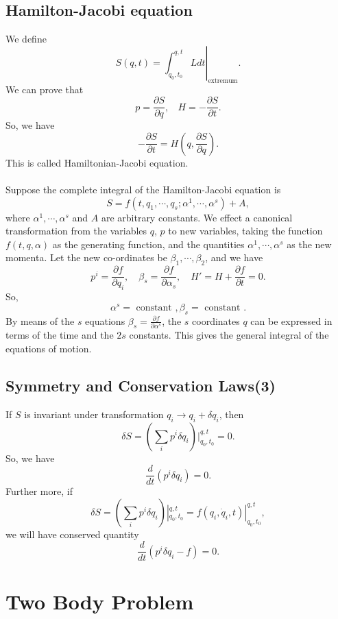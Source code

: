 \section{Hamilton-Jacobi equation}
We define
\[S(q,t)=\left. \int_{q_0,t_0}^{q,t} L dt\right|_{\mathrm{extremum}}.\]
We can prove that
\[p = \frac{\partial S}{\partial q}, \ \ \ \ H = -\frac{\partial S}{\partial t}.\]
So, we have
\[-\frac{\partial S}{\partial t} = H (q,\frac{\partial S}{\partial q}).\]
This is called Hamiltonian-Jacobi equation.\\ \\
Suppose the complete integral of the Hamilton-Jacobi equation is
\[S=f(t,q_1,\cdots,q_s;\alpha^1,\cdots,\alpha^s)+A,\]
where $\alpha^1,\cdots,\alpha^s$ and $A$ are arbitrary constants. 
We effect a canonical transformation from the variables $q$, $p$ to new variables, taking the function $f(t,q,\alpha)$ as the generating function, and the quantities $\alpha^1,\cdots,\alpha^s$ as the new momenta.
Let the new co-ordinates be $\beta_1,\cdots,\beta_2$, and we have
\[p^i = \frac{\partial f}{\partial q_i} ,\quad \beta_s = \frac{\partial f}{\partial \alpha_s} ,\quad H' = H + \frac{\partial f}{\partial t} =0.\]
So,
\[\alpha^s = \mbox{ constant }, \beta_s = \mbox{ constant }.\]
By means of the $s$ equations $\beta_s = \frac{\partial f}{\partial \alpha^s}$, the $s$ coordinates $q$ can be expressed in terms of the time and the $2s$ constants. This gives the general integral of the equations of motion.

\section{Symmetry and Conservation Laws(3)}
If $S$ is invariant under transformation $q_i \rightarrow q_i + \delta q_i$, then 
\[\delta S = (\sum_i p^i \delta q_i) |_{q_0,t_0}^{q,t} = 0.\]
So, we have
\[\frac{d}{dt} (p^i \delta q_i) = 0.\]
Further more, if
\[\delta S = (\sum_i p^i \delta q_i) |_{q_0,t_0}^{q,t} =  f(q_i,\dot{q}_i,t)|_{q_0,t_0}^{q,t}, \]
we will have conserved quantity
\[\frac{d}{dt} (p^i \delta q_i -f) = 0.\]

\chapter{Two Body Problem}
